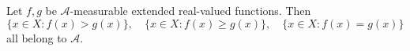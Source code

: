 Let $f, g$ be $\mathcal{A}$-measurable extended real-valued functions. Then
$$\{x \in X : f(x) > g(x)\},\quad \{x \in X : f(x) \geq g(x)\},\quad \{x \in X : f(x) = g(x)\}$$ all belong to $\mathcal{A}$.